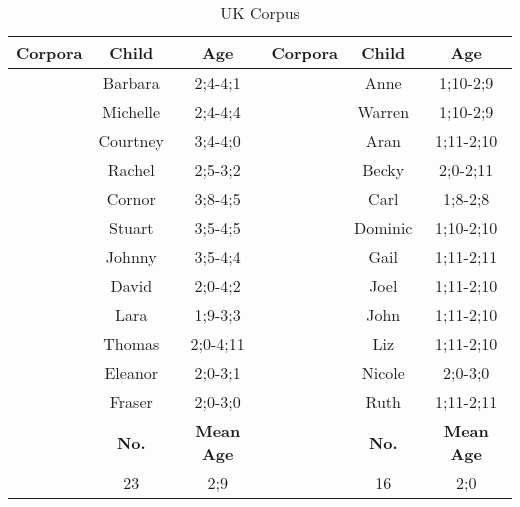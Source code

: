 \begin{table}[h1]
\small
\centering
\caption{UK Corpus} 
\begin{adjustbox}
\begin{tabular}{c|c|c|c|c|c}
\textbf{Corpora}  & \textbf{Child}  & \textbf{Age} &
\textbf{Corpora}  & \textbf{Child}  & \textbf{Age}\\
\hline
\multirow{}{}{\cite{henry1995belfast}} & Barbara & 2;4-4;1 & \multirow{}{}{\cite{theakston2001}} & Anne & 1;10-2;9\\
& Michelle & 2;4-4;4 & & Warren& 1;10-2;9 \\
& Courtney & 3;4-4;0 & &Aran & 1;11-2;10\\
 & Rachel & 2;5-3;2 & & Becky & 2;0-2;11\\
 & Cornor & 3;8-4;5 &  & Carl & 1;8-2;8\\
& Stuart & 3;5-4;5 & & Dominic & 1;10-2;10\\
 & Johnny & 3;5-4;4 & & Gail & 1;11-2;11\\
 & David & 2;0-4;2 &  & Joel & 1;11-2;10\\
\cite{rowland2006effect} & Lara & 1;9-3;3&  & John &1;11-2;10 \\
\cite{maslen2004dense} & Thomas & 2;0-4;11 & & Liz& 1;11-2;10\\
\multirow{}{}{\cite{lieven2009two}} &Eleanor &2;0-3;1 & & Nicole& 2;0-3;0 \\
&Fraser &2;0-3;0 & & Ruth& 1;11-2;11 \\
\hline
\hline
&\textbf{No.}&\textbf{Mean Age}& &\textbf{No.}&\textbf{Mean Age}\\
\cite{tommerdahl2013analyzing}&23&2;9&\cite{howe1981acquiring}&16&2;0\\
\hline

\end{tabular}
\end{adjustbox}
\end{table}

